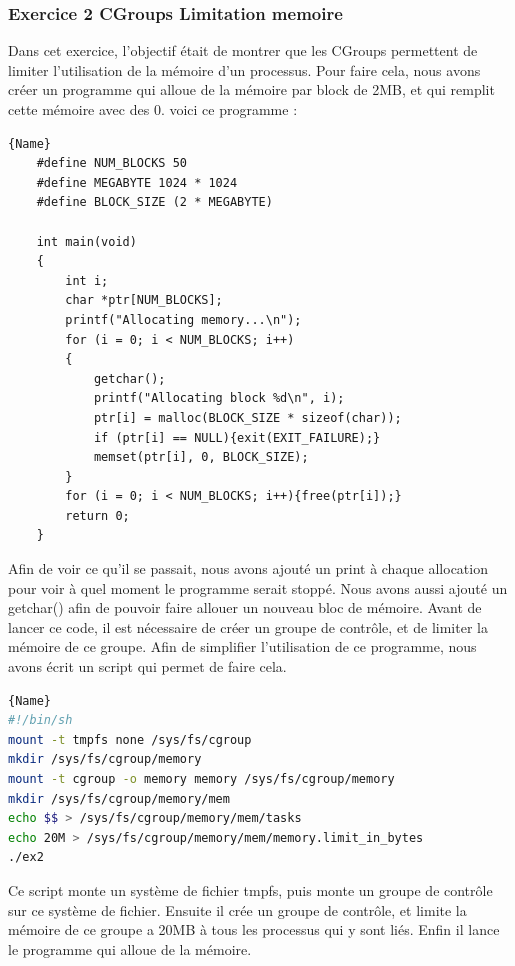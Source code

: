 \documentclass[
	a4paper, %
	10pt, %
]{CSUniSchoolLabReport}
\begin{document}
\subsubsection{Exercice 2 CGroups Limitation memoire}\label{MPEx2}
Dans cet exercice, l'objectif \'etait de montrer que les CGroups permettent de limiter l'utilisation de la m\'emoire d'un processus.
Pour faire cela, nous avons créer un programme qui alloue de la m\'emoire par block de 2MB, et qui remplit cette m\'emoire avec des 0.
voici ce programme : \\
\begin{lstlisting}[style=CStyle, caption=Allocation de memoire, firstnumber=1]{Name}
	#define NUM_BLOCKS 50
	#define MEGABYTE 1024 * 1024
	#define BLOCK_SIZE (2 * MEGABYTE)
	
	int main(void)
	{
		int i;
		char *ptr[NUM_BLOCKS];
		printf("Allocating memory...\n");
		for (i = 0; i < NUM_BLOCKS; i++)
		{
			getchar();
			printf("Allocating block %d\n", i);
			ptr[i] = malloc(BLOCK_SIZE * sizeof(char));
			if (ptr[i] == NULL){exit(EXIT_FAILURE);}
			memset(ptr[i], 0, BLOCK_SIZE);
		}
		for (i = 0; i < NUM_BLOCKS; i++){free(ptr[i]);}
		return 0;
	}
\end{lstlisting}
Afin de voir ce qu'il se passait, nous avons ajout\'e un print \`a chaque allocation pour voir \`a quel moment le programme serait stoppé.
Nous avons aussi ajout\'e un getchar() afin de pouvoir faire allouer un nouveau bloc de m\'emoire.
\linebreak
Avant de lancer ce code, il est n\'ecessaire de créer un groupe de contr\^ole, et de limiter la m\'emoire de ce groupe. Afin de simplifier l'utilisation de ce programme, nous avons écrit un script qui permet de faire cela.

\begin{lstlisting}[language=bash, firstnumber=1]{Name}
#!/bin/sh
mount -t tmpfs none /sys/fs/cgroup
mkdir /sys/fs/cgroup/memory
mount -t cgroup -o memory memory /sys/fs/cgroup/memory
mkdir /sys/fs/cgroup/memory/mem
echo $$ > /sys/fs/cgroup/memory/mem/tasks
echo 20M > /sys/fs/cgroup/memory/mem/memory.limit_in_bytes
./ex2
\end{lstlisting}
Ce script monte un syst\`eme de fichier tmpfs, puis monte un groupe de contr\^ole sur ce syst\`eme de fichier.
Ensuite il cr\'ee un groupe de contr\^ole, et limite la m\'emoire de ce groupe a 20MB \`a tous les processus qui y sont liés.
Enfin il lance le programme qui alloue de la m\'emoire.
\end{document}
